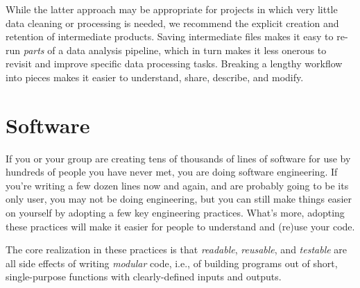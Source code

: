 \documentclass[10pt,letterpaper]{article}
\newcommand{\practicesection}[2]{\section{#1}\label{#2}}
\begin{document}
While the latter approach may be appropriate for projects in which very
little data cleaning or processing is needed, we recommend the explicit
creation and retention of intermediate products. Saving intermediate
files makes it easy to re-run \emph{parts} of a data analysis pipeline,
which in turn makes it less onerous to revisit and improve specific data
processing tasks. Breaking a lengthy workflow into pieces makes it
easier to understand, share, describe, and modify.

\practicesection{Software}{sec:software}

If you or your group are creating tens of thousands of lines of
software for use by hundreds of people you have never met, you are
doing software engineering. If you're writing a few dozen lines now
and again, and are probably going to be its only user, you may not be
doing engineering, but you can still make things easier on yourself by
adopting a few key engineering practices. What's more, adopting these
practices will make it easier for people to understand and (re)use
your code.

The core realization in these practices is that \emph{readable},
\emph{reusable}, and \emph{testable} are all side effects of writing
\emph{modular} code, i.e., of building programs out of short,
single-purpose functions with clearly-defined inputs and outputs.
\end{document}
